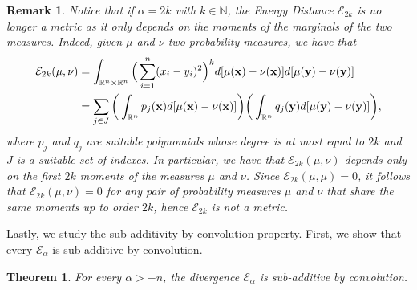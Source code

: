\documentclass{article}
\newcommand{\N}{\mathbb N}
\def\N{\mathbb{N}}
\def\bx{{\bf x}}
\def\by{{\bf y}}
\def \erre{\mathbb{R}}
\newtheorem{theorem}{Theorem}
\newtheorem{remark}{Remark}
\begin{document}
\begin{remark}
    Notice that if $\alpha=2k$ with $k\in\N$, the Energy Distance $\mathcal{E}_{2k}$ is no longer a metric as it only depends on the moments of the marginals of the two measures.
    Indeed, given $\mu$ and $\nu$ two probability measures, we have that
    \begin{align*}
        \mathcal{E}_{2k}(\mu,\nu)&=\int_{\erre^n\times\erre^n}\Big(\sum_{i=1}^n(x_i-y_i)^2\Big)^kd[\mu(\bx)-\nu(\bx)]d[\mu(\by)-\nu(\by)]\\
        &=\sum_{j\in J}\bigg(\int_{\erre^n}p_j(\bx)d[\mu(\bx)-\nu(\bx)]\bigg)\bigg(\int_{\erre^n}q_j(\by)d[\mu(\by)-\nu(\by)]\bigg),
    \end{align*}
    where $p_j$ and $q_j$ are suitable polynomials whose degree is at most equal to $2k$ and $J$ is a suitable set of indexes.
    In particular, we have that $\mathcal{E}_{2k}(\mu,\nu)$ depends only on the first $2k$ moments of the measures $\mu$ and $\nu$.
    Since $\mathcal{E}_{2k}(\mu, \mu)=0$, it follows that $\mathcal{E}_{2k}(\mu, \nu)=0$ for any pair of probability measures $\mu$ and $\nu$ that share the same moments up to order $2k$, hence $\mathcal{E}_{2k}$ is not a metric.
\end{remark}

% 
Lastly, we study the sub-additivity by convolution property.
% 
First, we show that every $\mathcal{E}_\alpha$ is sub-additive by convolution.
% 

\begin{theorem}
    For every $\alpha>-n$, the divergence $\mathcal{E}_\alpha$ is sub-additive by convolution.
\end{theorem}
\end{document}

